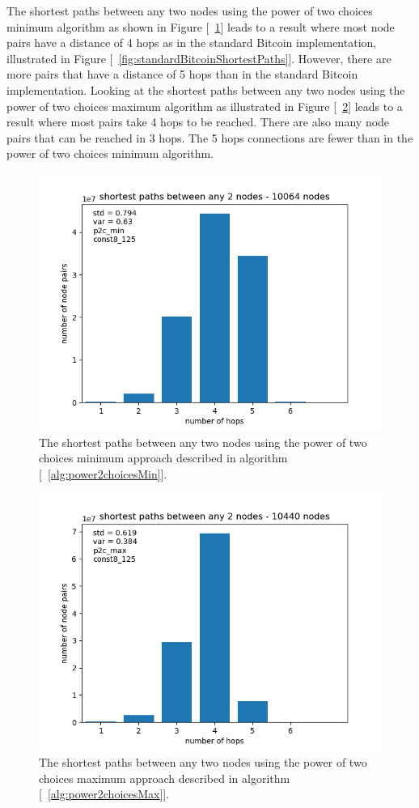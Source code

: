 \documentclass[a4paper, oneside]{discothesis}
\begin{document}
The shortest paths between any two nodes using the power of two choices minimum algorithm as shown in Figure [~\ref{fig:p2cMinShortestPath}] leads to a result where most node pairs have a distance of 4 hops as in the standard Bitcoin implementation, illustrated in Figure [~\ref{fig:standardBitcoinShortestPaths}]. However, there are more pairs that have a distance of 5 hops than in the standard Bitcoin implementation.
Looking at the shortest paths between any two nodes using the power of two choices maximum algorithm as illustrated in Figure [~\ref{fig:p2cMaxShortestPath}] leads to a result where most pairs take 4 hops to be reached. There are also many node pairs that can be reached in 3 hops. The 5 hops connections are fewer than in the power of two choices minimum algorithm.

\begin{figure}
    \centering
    \includegraphics[width=.8\columnwidth]{figures/power2choices/p2c-min/final-shortest-paths-between-any-nodes-10064-nodes.png}
    \caption{The shortest paths between any two nodes using the power of two choices minimum approach described in algorithm [~\ref{alg:power2choicesMin}].}
    \label{fig:p2cMinShortestPath}
\end{figure}

\begin{figure}
    \centering
    \includegraphics[width=.8\columnwidth]{figures/power2choices/p2c-max/final-shortest-paths-between-any-nodes-10440-nodes.png}
    \caption{The shortest paths between any two nodes using the power of two choices maximum approach described in algorithm [~\ref{alg:power2choicesMax}].}
    \label{fig:p2cMaxShortestPath}
\end{figure}
\end{document}
